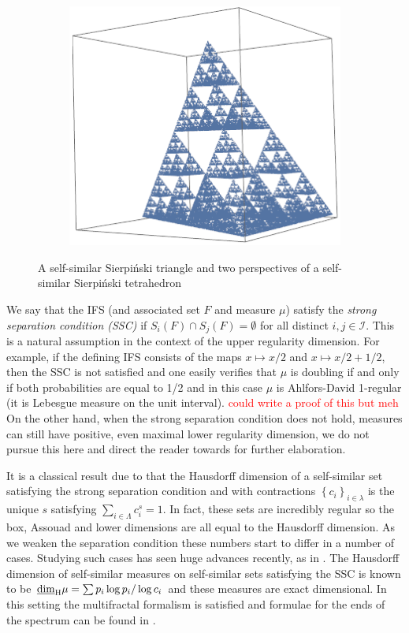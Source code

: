 \begin{figure}[h]
	\begin{subfigure}{.3\textwidth}
		\centering
		\includegraphics[width=.9\linewidth]{pics/ch-upper-reg/sierptetra2.png}
	\end{subfigure}
	\caption{A self-similar Sierpi\'nski triangle and two perspectives of a self-similar Sierpi\'nski tetrahedron}
	\label{ch-upper-reg:fig:test}
\end{figure}

We say that the IFS (and associated set $F$ and measure $\mu$) satisfy the \emph{strong separation condition (SSC)} if $S_i(F) \cap S_j(F) = \emptyset$ for all distinct $i,j \in \mathcal{I}$.  This is a natural assumption in the context of the upper regularity dimension. For example, if the defining IFS consists of the maps $x \mapsto x/2$ and $x \mapsto x/2+1/2$, then the SSC is not satisfied and one easily verifies that $\mu$ is doubling if and only if both probabilities are equal to 1/2 and in this case $\mu$ is Ahlfors-David 1-regular (it is Lebesgue measure on the unit interval). \textcolor{red}{could write a proof of this but meh} On the other hand, when the strong separation condition does not hold, measures can still have positive, even maximal lower regularity dimension, we do not pursue this here and direct the reader towards \cite{hare-troscheit} for further elaboration.  

It is a classical result due to \cite{hutchinson} that the Hausdorff dimension of a self-similar set satisfying the strong separation condition and with contractions $\left\{c_i \right\}_{i\in \lambda}$ is the unique $s$ satisfying $\sum_{i\in \Lambda} c_i^s = 1$. In fact, these sets are incredibly regular so the box, Assouad and lower dimensions are all equal to the Hausdorff dimension. As we weaken the separation condition these numbers start to differ in a number of cases. Studying such cases has seen huge advances recently, as in \cite{hochman2}. The Hausdorff dimension of self-similar measures on self-similar sets satisfying the SSC is known to be $\underline{\dim}_{\textup{H}} \mu = \sum p_i \log p_i / \log c_i$ and these measures are exact dimensional. In this setting the multifractal formalism is satisfied and formulae for the ends of the spectrum can be found in \cite{cawley-mauldin}.

